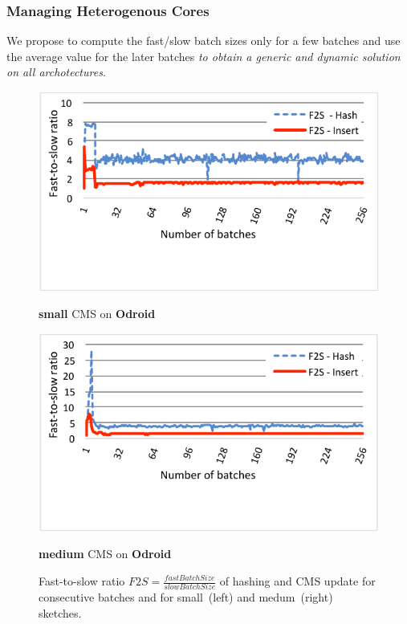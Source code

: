 \documentclass{beamer}
\begin{document}
\begin{frame}
	\frametitle{Managing Heterogenous Cores}
	 We propose to compute the fast/slow batch sizes only for a few batches and use the average value for the later batches {\it to obtain a generic and dynamic solution on all archotectures}. 
	
	\vspace{-4mm}
	\begin{figure}[H]
		\begin{minipage}[c]{0.49\textwidth}
			\includegraphics[width=\linewidth]{f2s-small.pdf}
			\caption{{\bf small} CMS on {\bf Odroid}}
			\label{fig:fs-small}
		\end{minipage}\hspace*{3ex}
		\begin{minipage}[c]{0.49\textwidth}
			\includegraphics[width=\linewidth]{f2s-big.pdf}
			\caption{{\bf medium} CMS on {\bf Odroid}}
			\label{fig:fs-large}
		\end{minipage}
		
		\caption{\small{Fast-to-slow ratio $F2S = \frac{fastBatchSize}{slowBatchSize}$ of hashing and CMS update for consecutive batches and for small~(left) and medum~(right) sketches.}}
		\label{fig:load}
		\vspace*{-6ex}
	\end{figure}
	
\end{frame}
\end{document}
